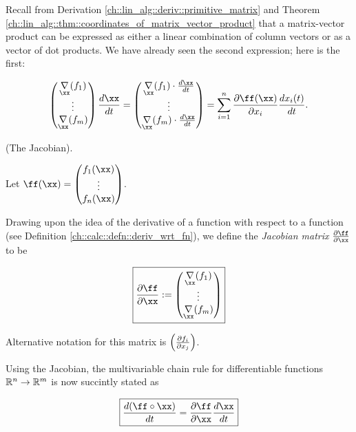 \begin{lemma}
    Recall from Derivation \ref{ch::lin_alg::deriv::primitive_matrix} and Theorem \ref{ch::lin_alg::thm::coordinates_of_matrix_vector_product} that a matrix-vector product can be expressed as either a linear combination of column vectors or as a vector of dot products. We have already seen the second expression; here is the first:
    
    \begin{align*}
        \begin{pmatrix}
            \underset{\xx}{\nabla} (f_1)
            \\
            \vdots
            \\
            \underset{\xx}{\nabla} (f_m)
        \end{pmatrix}
        \frac{d \xx}{d t}
        =
        \begin{pmatrix}
            \underset{\xx}{\nabla} (f_1) \cdot \frac{d \xx}{d t}
            \\
            \vdots
            \\
            \underset{\xx}{\nabla} (f_m) \cdot \frac{d \xx}{d t}
        \end{pmatrix}
        =
        \sum_{i = 1}^{n} \frac{\pd \ff(\xx)}{\pd x_i} \frac{d x_i(t)}{d t}.
    \end{align*}
\end{lemma}

\begin{defn}
\label{ch::calc::defn::jacobian}
    (The Jacobian).
    
    Let $\ff(\xx) = \begin{pmatrix} f_1(\xx) \\ \vdots \\ f_n(\xx) \end{pmatrix}$.
    
    Drawing upon the idea of the derivative of a function with respect to a function (see Definition \ref{ch::calc::defn::deriv_wrt_fn}), we define the \textit{Jacobian matrix} $\frac{\pd \ff}{\pd \xx}$ to be
    
    \begin{align*}
        \boxed
        {
            \frac{\pd \ff}{\pd \xx}
            :=
            \begin{pmatrix}
                \underset{\xx}{\nabla} (f_1)
                \\
                \vdots
                \\
                \underset{\xx}{\nabla} (f_m)
            \end{pmatrix}
        }
    \end{align*}
    
    Alternative notation for this matrix is $\Big( \frac{\partial f_i}{\partial x_j} \Big)$.
    
    Using the Jacobian, the multivariable chain rule for differentiable functions $\mathbb{R}^n \rightarrow \mathbb{R}^m$ is now succintly stated as
    
    \begin{align*}
        \boxed
        {
            \frac{d (\ff \circ \xx)}{dt} = \frac{\pd\ff}{\pd\xx} \frac{d\xx}{dt}
        }
    \end{align*}
\end{defn}

